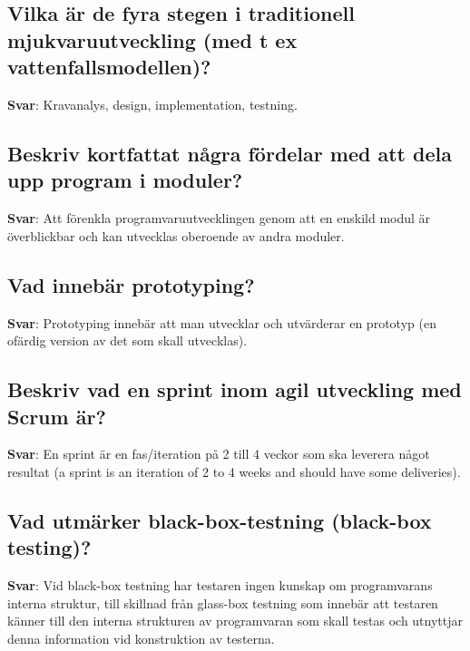 \documentclass[a4paper,11pt,oneside]{article}
\begin{document}
\begin{sloppypar}
\subsection{Vilka \"ar de fyra stegen i traditionell mjukvaruutveckling (med t ex vattenfallsmodellen)?}

\label{q:233:sa:sv:True}

\textbf{Svar}: Kravanalys, design, implementation, testning.



\subsection{Beskriv kortfattat n\r{a}gra f\"ordelar med att dela upp program i moduler?}

\label{q:234:sa:sv:True}

\textbf{Svar}: Att f\"orenkla programvaruutvecklingen genom att en enskild modul \"ar \"overblickbar och kan utvecklas oberoende av andra moduler.



\subsection{Vad inneb\"ar prototyping?}

\label{q:235:sa:sv:True}

\textbf{Svar}: Prototyping inneb\"ar att man utvecklar och utv\"arderar en prototyp (en of\"ardig version av det som skall utvecklas).



\subsection{Beskriv vad en sprint inom agil utveckling med Scrum \"ar?}

\label{q:236:sa:sv:True}

\textbf{Svar}: En sprint \"ar en fas/iteration p\r{a} 2 till 4 veckor som ska leverera n\r{a}got resultat (a sprint is an iteration of 2 to 4 weeks and should have some deliveries).



\subsection{Vad utm\"arker black-box-testning (black-box testing)?}

\label{q:237:sa:sv:True}

\textbf{Svar}: Vid black-box testning har testaren ingen kunskap om programvarans interna struktur, till skillnad fr\r{a}n glass-box testning som inneb\"ar att testaren k\"anner till den interna strukturen av programvaran som skall testas och utnyttjar denna information vid konstruktion av testerna.




\end{sloppypar}
\end{document}
